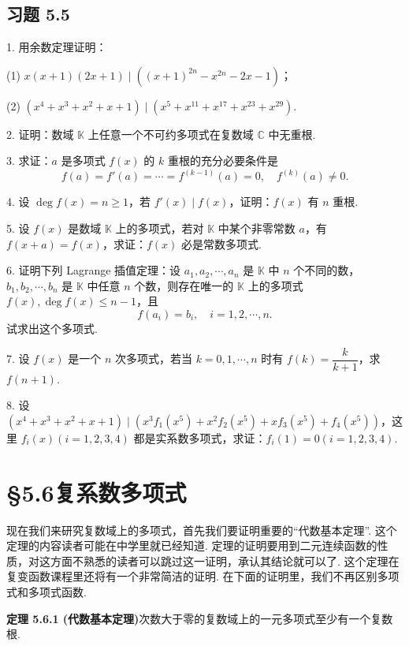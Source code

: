 \documentclass[UTF8, 12pt, fontset=fandol, oneside]{ctexart}
\begin{document}
\subsection*{习题 5.5}

1. 用余数定理证明：

(1) $x(x+1)(2x+1)\mid ((x+1)^{2n}-x^{2n}-2x-1)$；

(2) $(x^4+x^3+x^2+x+1)\mid (x^5+x^{11}+x^{17}+x^{23}+x^{29})$.

2. 证明：数域 $\mathbb{K}$ 上任意一个不可约多项式在复数域 $\mathbb{C}$ 中无重根.

3. 求证：$a$ 是多项式 $f(x)$ 的 $k$ 重根的充分必要条件是
\[
f(a)=f'(a)=\cdots=f^{(k-1)}(a)=0,\quad f^{(k)}(a)\neq 0.
\]

4. 设 $\deg f(x)=n\geq 1$，若 $f'(x)\mid f(x)$，证明：$f(x)$ 有 $n$ 重根.

5. 设 $f(x)$ 是数域 $\mathbb{K}$ 上的多项式，若对 $\mathbb{K}$ 中某个非零常数 $a$，有 $f(x+a)=f(x)$，求证：$f(x)$ 必是常数多项式.

6. 证明下列 Lagrange 插值定理：设 $a_1,a_2,\cdots,a_n$ 是 $\mathbb{K}$ 中 $n$ 个不同的数，$b_1,b_2,\cdots,b_n$ 是 $\mathbb{K}$ 中任意 $n$ 个数，则存在唯一的 $\mathbb{K}$ 上的多项式 $f(x),\deg f(x)\leq n-1$，且
\[
f(a_i)=b_i,\quad i=1,2,\cdots,n.
\]
试求出这个多项式.

7. 设 $f(x)$ 是一个 $n$ 次多项式，若当 $k=0,1,\cdots,n$ 时有 $f(k)=\dfrac{k}{k+1}$，求 $f(n+1)$.

8. 设 $(x^4+x^3+x^2+x+1)\mid (x^3f_1(x^5)+x^2f_2(x^5)+xf_3(x^5)+f_4(x^5))$，这里 $f_i(x)(i=1,2,3,4)$ 都是实系数多项式，求证：$f_i(1)=0(i=1,2,3,4)$.

\section*{§5.6\quad 复系数多项式}

现在我们来研究复数域上的多项式，首先我们要证明重要的“代数基本定理”. 这个定理的内容读者可能在中学里就已经知道. 定理的证明要用到二元连续函数的性质，对这方面不熟悉的读者可以跳过这一证明，承认其结论就可以了. 这个定理在复变函数课程里还将有一个非常简洁的证明. 在下面的证明里，我们不再区别多项式和多项式函数.

\noindent\textbf{定理 5.6.1 (代数基本定理)}\quad 次数大于零的复数域上的一元多项式至少有一个复数根.
\end{document}
